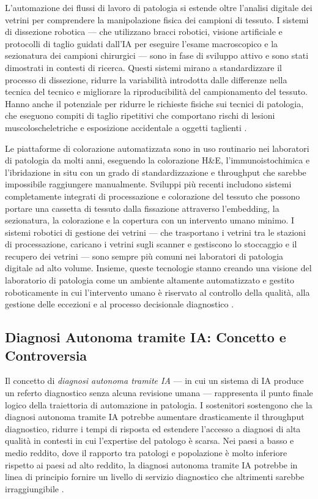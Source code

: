 L'automazione dei flussi di lavoro di patologia si estende oltre l'analisi digitale dei vetrini per comprendere la manipolazione fisica dei campioni di tessuto. I sistemi di dissezione robotica — che utilizzano bracci robotici, visione artificiale e protocolli di taglio guidati dall'IA per eseguire l'esame macroscopico e la sezionatura dei campioni chirurgici — sono in fase di sviluppo attivo e sono stati dimostrati in contesti di ricerca. Questi sistemi mirano a standardizzare il processo di dissezione, ridurre la variabilità introdotta dalle differenze nella tecnica del tecnico e migliorare la riproducibilità del campionamento del tessuto. Hanno anche il potenziale per ridurre le richieste fisiche sui tecnici di patologia, che eseguono compiti di taglio ripetitivi che comportano rischi di lesioni muscoloscheletriche e esposizione accidentale a oggetti taglienti \cite{elendu2023}.

Le piattaforme di colorazione automatizzata sono in uso routinario nei laboratori di patologia da molti anni, eseguendo la colorazione H\&E, l'immunoistochimica e l'ibridazione in situ con un grado di standardizzazione e throughput che sarebbe impossibile raggiungere manualmente. Sviluppi più recenti includono sistemi completamente integrati di processazione e colorazione del tessuto che possono portare una cassetta di tessuto dalla fissazione attraverso l'embedding, la sezionatura, la colorazione e la copertura con un intervento umano minimo. I sistemi robotici di gestione dei vetrini — che trasportano i vetrini tra le stazioni di processazione, caricano i vetrini sugli scanner e gestiscono lo stoccaggio e il recupero dei vetrini — sono sempre più comuni nei laboratori di patologia digitale ad alto volume. Insieme, queste tecnologie stanno creando una visione del laboratorio di patologia come un ambiente altamente automatizzato e gestito roboticamente in cui l'intervento umano è riservato al controllo della qualità, alla gestione delle eccezioni e al processo decisionale diagnostico \cite{song2023}.

\subsection{Diagnosi Autonoma tramite IA: Concetto e Controversia}

Il concetto di \emph{diagnosi autonoma tramite IA} — in cui un sistema di IA produce un referto diagnostico senza alcuna revisione umana — rappresenta il punto finale logico della traiettoria di automazione in patologia. I sostenitori sostengono che la diagnosi autonoma tramite IA potrebbe aumentare drasticamente il throughput diagnostico, ridurre i tempi di risposta ed estendere l'accesso a diagnosi di alta qualità in contesti in cui l'expertise del patologo è scarsa. Nei paesi a basso e medio reddito, dove il rapporto tra patologi e popolazione è molto inferiore rispetto ai paesi ad alto reddito, la diagnosi autonoma tramite IA potrebbe in linea di principio fornire un livello di servizio diagnostico che altrimenti sarebbe irraggiungibile \cite{elendu2023}.

